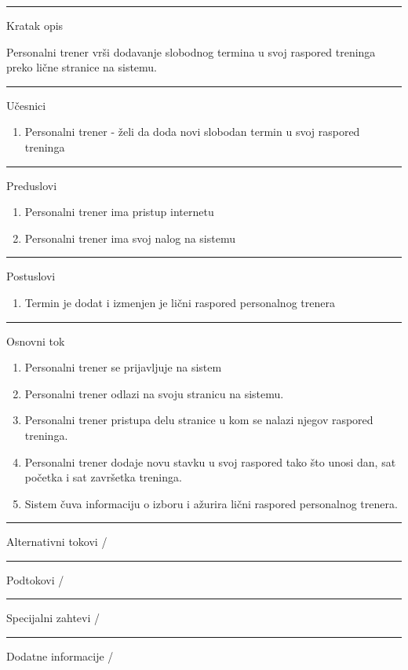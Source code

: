\begin{center}
\vspace{0.2cm}
\hrule
\vspace{0.2cm}
    \begin{center}
    Kratak opis  
    \end{center}
    Personalni trener vrši dodavanje slobodnog termina u svoj raspored treninga preko lične stranice na sistemu.
    \vspace{0.2cm}\\ 
\hrule   
\vspace{0.2cm}
    Učesnici
    \begin{enumerate}
        \item Personalni trener - želi da doda novi slobodan termin u svoj raspored treninga
    \end{enumerate}
\hrule
\vspace{0.2cm}
   Preduslovi
   \begin{enumerate}
        \item Personalni trener ima pristup internetu
        \item Personalni trener ima svoj nalog na sistemu
    \end{enumerate}
\hrule  
\vspace{0.2cm}
    Postuslovi
    \begin{enumerate}
        \item Termin je dodat i izmenjen je lični raspored personalnog trenera
    \end{enumerate}
\hrule
\vspace{0.2cm}
    Osnovni tok 
    \begin{enumerate}
        \item Personalni trener se prijavljuje na sistem
        \item Personalni trener odlazi na svoju stranicu na sistemu.
        \item Personalni trener pristupa delu stranice u kom se nalazi njegov raspored treninga.
        \item Personalni trener dodaje novu stavku u svoj raspored tako što unosi dan, sat početka i sat završetka treninga.
        \item Sistem čuva informaciju o izboru i ažurira lični raspored personalnog trenera.
        \end{enumerate}
\hrule
\vspace{0.2cm}
    Alternativni tokovi  /\\
\hrule
\vspace{0.2cm}
    Podtokovi  /\\
\hrule
\vspace{0.2cm}
    Specijalni zahtevi  /\\
\hrule
\vspace{0.2cm}
    Dodatne informacije /\\
\hline
\vspace{0.5cm}
\end{center}




